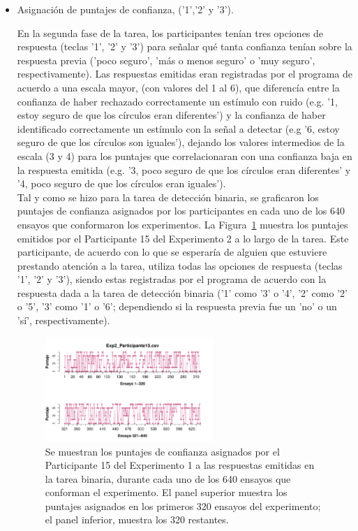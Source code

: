 \begin{itemize}

\item Asignación de puntajes de confianza, ('1','2' y '3').

En la segunda fase de la tarea, los participantes tenían tres opciones de respuesta (teclas '1', '2' y '3') para señalar qué tanta confianza tenían sobre la respuesta previa ('poco seguro', 'más o menos seguro' o 'muy seguro', respectivamente). Las respuestas emitidas eran registradas por el programa de acuerdo a una escala mayor, (con valores del 1 al 6), que diferencía entre la confianza de haber rechazado correctamente un estímulo con ruido (e.g. '1, estoy seguro de que los círculos eran diferentes') y la confianza de haber identificado correctamente un estímulo con la señal a detectar (e.g '6, estoy seguro de que los círculos son iguales'), dejando los valores intermedios de la escala (3 y 4) para los puntajes que correlacionaran con una confianza baja en la respuesta emitida (e.g. '3, poco seguro de que los círculos eran diferentes' y '4, poco seguro de que los círculos eran iguales').\\

Tal y como se hizo para la tarea de detección binaria, se graficaron los puntajes de confianza asignados por los participantes en cada uno de los 640 ensayos que conformaron los experimentos. La Figura~\ref{fig:Rating_E2_P4} muestra los puntajes emitidos por el Participante 15 del Experimento 2 a lo largo de la tarea. Este participante, de acuerdo con lo que se esperaría de alguien que estuviere prestando atención a la tarea, utiliza todas las opciones de respuesta (teclas '1', '2' y '3'), siendo estas registradas por el programa de acuerdo con la respuesta dada a la tarea de detección binaria ('1' como '3' o '4', '2' como '2' o '5', '3' como '1' o '6'; dependiendo si la respuesta previa fue un 'no' o un 'sí', respectivamente).\\ 
 
\begin{figure}[th]
\centering
\includegraphics[width=0.60\textwidth]{Figures/Rating_Exp2_P15} 
\caption[Asignacion Puntaje de confianza: Ejemplo]{Se muestran los puntajes de confianza asignados por el Participante 15 del Experimento 1 a las respuestas emitidas en la tarea binaria, durante cada uno de los 640 ensayos que conforman el experimento. El panel superior muestra los puntajes asignados en los primeros 320 ensayos del experimento; el panel inferior, muestra los 320 restantes.}
\label{fig:Rating_E2_P4}
\end{figure}


\end{itemize}
